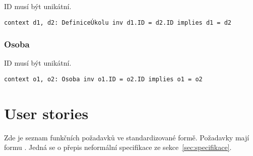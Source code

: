 ID musí být unikátní.

\begin{verbatim}
context d1, d2: DefiniceÚkolu inv d1.ID = d2.ID implies d1 = d2
\end{verbatim}

\subsubsection{Osoba}

ID musí být unikátní.

\begin{verbatim}
context o1, o2: Osoba inv o1.ID = o2.ID implies o1 = o2
\end{verbatim}

\section{User stories}\label{sec:user-stories}

Zde je seznam funkčních požadavků ve standardizované formě.
Požadavky mají formu .
Jedná se o přepis neformální specifikace ze sekce~\ref{sec:specifikace}.

